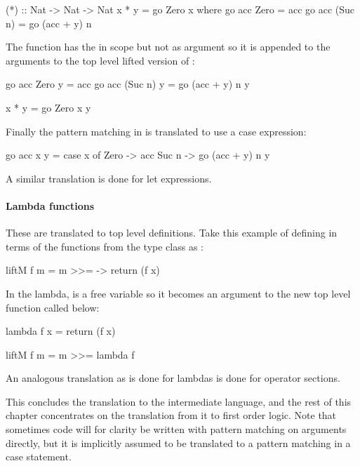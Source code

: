\begin{code}
(*) :: Nat -> Nat -> Nat
x * y = go Zero x where go acc Zero    = acc
                        go acc (Suc n) = go (acc + y) n
\end{code}

\noindent
The  function has the  in scope but not as argument so it
is appended to the arguments to the top level lifted version of :

\begin{code}
go acc Zero    y = acc
go acc (Suc n) y = go (acc + y) n y

x * y = go Zero x y
\end{code}

\noindent
Finally the pattern matching in  is translated to use a case expression:

\begin{code}
go acc x y = case x of
     Zero  -> acc
     Suc n -> go (acc + y) n y
\end{code}

A similar translation is done for let expressions.

\paragraph{Lambda functions} These are translated to top level
definitions. Take this example of defining  in terms of the
functions from the  type class as :

\begin{code}
liftM f m = m >>= \x -> return (f x)
\end{code}

\noindent
In the lambda,  is a free variable so it becomes an argument to
the new top level function called  below:

\begin{code}
lambda f x = return (f x)

liftM f m = m >>= lambda f
\end{code}

An analogous translation as is done for lambdas is done for operator sections.

This concludes the translation to the intermediate language, and the
rest of this chapter concentrates on the translation from it to first
order logic. Note that sometimes code will for clarity be written with pattern
matching on arguments directly, but it is implicitly assumed to be
translated to a pattern matching in a case statement.

